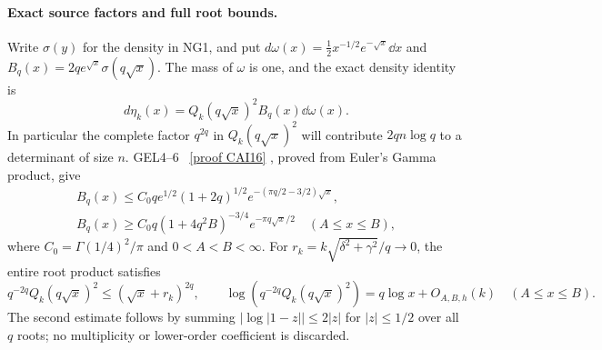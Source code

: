 \documentclass[11pt]{article}
\begin{document}
\paragraph{Exact source factors and full root bounds.}
Write $\sigma(y)$ for the density in NG1, and put
$d\omega(x)=\frac12x^{-1/2}e^{-\sqrt x}\dd x$ and
$B_q(x)=2q e^{\sqrt x}\sigma(q\sqrt x)$. The mass of $\omega$ is one,
and the exact density identity is
\begin{equation}\tag{NG12}
 d\eta_k(x)=Q_k(q\sqrt x)^2B_q(x)\dd\omega(x).
\end{equation}
In particular the complete factor $q^{2q}$ in $Q_k(q\sqrt x)^2$
will contribute $2qn\log q$ to a determinant of size $n$.
GEL4--6 \cite{cumulative}%
~\href{https://github.com/KokunoYumeto/zeta-function-research-reader/blob/5992ad50c0f2a06921f1fcaded7b4e38097c0739/workbenches/splitzero-tandem/continuations/20260920-original-kernel-mixed-determinants/cumulative/09_UPDATED_JOINT_NOTE.tex\#L63199}{[proof CAI16]}%
{}, proved from Euler's Gamma product, give
\begin{gather*}
 B_q(x)\le C_0q e^{1/2}(1+2q)^{1/2}
             e^{-(\pi q/2-3/2)\sqrt x},\\
 B_q(x)\ge C_0q(1+4q^2B)^{-3/4}e^{-\pi q\sqrt x/2}
 \quad(A\le x\le B),
\end{gather*}
where $C_0=\Gamma(1/4)^2/\pi$ and $0<A<B<\infty$.
For $r_k=k\sqrt{\delta^2+\gamma^2}/q\to0$, the entire root product
satisfies
\begin{equation}\tag{NG13}
 q^{-2q}Q_k(q\sqrt x)^2\le(\sqrt x+r_k)^{2q},\qquad
 \log(q^{-2q}Q_k(q\sqrt x)^2)=q\log x+O_{A,B,h}(k)
 \quad(A\le x\le B).
\end{equation}
The second estimate follows by summing
$|\log|1-z||\le2|z|$ for $|z|\le1/2$ over all $q$ roots;
no multiplicity or lower-order coefficient is discarded.
\end{document}
